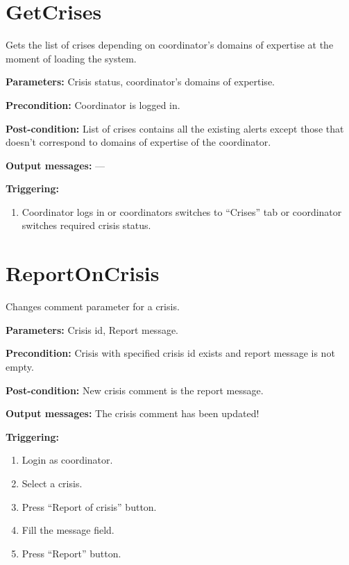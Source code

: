 \section{GetCrises}
\label{operation:GetCrises}
Gets the list of crises depending on coordinator’s domains of expertise at the
moment of loading the system.

\begin{description}

\item \textbf{Parameters:} Crisis status, coordinator’s domains of
expertise.
\item \textbf{Precondition:} Coordinator is logged in.
\item \textbf{Post-condition:} List of crises contains all the existing alerts
except those that doesn’t correspond to domains of expertise of the coordinator.

\item \textbf{Output messages:} ---

\item \textbf{Triggering:}
\begin{enumerate}
\item Coordinator logs in or coordinators switches to ``Crises'' tab or
coordinator switches required crisis status.
\end{enumerate}
 
\end{description}

\section{ReportOnCrisis}
\label{operation:ReportOnCrisis}
Changes comment parameter for a crisis.

\begin{description}

\item \textbf{Parameters:} Crisis id, Report message.
\item \textbf{Precondition:} Crisis with specified crisis id exists and report
message is not empty.
\item \textbf{Post-condition:} New crisis comment is the report message.

\item \textbf{Output messages:} The crisis comment has been updated!

\item \textbf{Triggering:}
\begin{enumerate}
\item Login as coordinator.
\item Select a crisis.
\item Press ``Report of crisis'' button.
\item Fill the message field.
\item Press ``Report'' button.
\end{enumerate}
 
\end{description}

